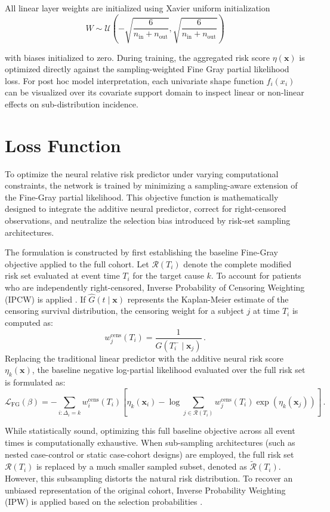 \documentclass[a4paper,twoside,12pt]{report}
\begin{document}
All linear layer weights are initialized using Xavier uniform initialization 
\begin{equation}
    W \sim \mathcal{U}\left(-\sqrt{\frac{6}{n_{\text{in}} + n_{\text{out}}}}, \sqrt{\frac{6}{n_{\text{in}} + n_{\text{out}}}}\right)
\end{equation}

with biases initialized to zero. During training, the aggregated risk score $\eta(\mathbf{x})$ is optimized directly against the sampling-weighted Fine Gray partial likelihood loss. For post hoc model interpretation, each univariate shape function $f_i(x_i)$ can be visualized over its covariate support domain to inspect linear or non-linear effects on sub-distribution incidence.


\section{Loss Function}

To optimize the neural relative risk predictor under varying computational constraints, the network is trained by minimizing a sampling-aware extension of the Fine-Gray partial likelihood. This objective function is mathematically designed to integrate the additive neural predictor, correct for right-censored observations, and neutralize the selection bias introduced by risk-set sampling architectures. 

The formulation is constructed by first establishing the baseline Fine-Gray objective applied to the full cohort. Let $\mathcal{R}(T_i)$ denote the complete modified risk set evaluated at event time $T_i$ for the target cause $k$. To account for patients who are independently right-censored, Inverse Probability of Censoring Weighting (IPCW) is applied \citep{Graf1999}. If $\hat{G}(t \mid \mathbf{x})$ represents the Kaplan-Meier estimate of the censoring survival distribution, the censoring weight for a subject $j$ at time $T_i$ is computed as:
$$ w_j^{\text{cens}}(T_i) = \frac{1}{\hat{G}(T_i^- \mid \mathbf{x}_j)} \,.$$
Replacing the traditional linear predictor with the additive neural risk score $\eta_k(\mathbf{x})$, the baseline negative log-partial likelihood evaluated over the full risk set is formulated as:
$$ \mathcal{L}_{\text{FG}}(\beta) = -\sum_{i:\Delta_i = k} w_i^{\text{cens}}(T_i) \left[ \eta_k(\mathbf{x}_i) - \log \sum_{j \in \mathcal{R}(T_i)} w_j^{\text{cens}}(T_i) \exp(\eta_k(\mathbf{x}_j)) \right] \,.$$

While statistically sound, optimizing this full baseline objective across all event times is computationally exhaustive. When sub-sampling architectures (such as nested case-control or static case-cohort designs) are employed, the full risk set $\mathcal{R}(T_i)$ is replaced by a much smaller sampled subset, denoted as $\tilde{\mathcal{R}}(T_i)$. However, this subsampling distorts the natural risk distribution. To recover an unbiased representation of the original cohort, Inverse Probability Weighting (IPW) is applied based on the selection probabilities \citep{HorvitzThompson1952, Prentice1986}.
\end{document}
